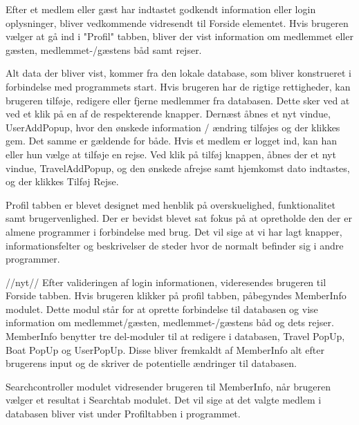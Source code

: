 Efter et medlem eller gæst har indtastet godkendt information eller login oplysninger, bliver vedkommende vidresendt til Forside elementet. Hvis brugeren vælger at gå ind i "Profil" tabben, bliver der vist information om medlemmet eller gæsten, medlemmet-/gæstens båd samt rejser. 

Alt data der bliver vist, kommer fra den lokale database, som bliver konstrueret i forbindelse med programmets start.
Hvis brugeren har de rigtige rettigheder, kan brugeren tilføje, redigere eller fjerne medlemmer fra databasen. Dette sker ved at ved et klik på en af de respekterende knapper. Dernæst åbnes et nyt vindue, UserAddPopup, hvor den ønskede information / ændring tilføjes og der klikkes gem. Det samme er gældende for både.
Hvis et medlem er logget ind, kan han eller hun vælge at tilføje en rejse. Ved klik på tilføj knappen, åbnes der et nyt vindue, TravelAddPopup, og den ønskede afrejse samt hjemkomst dato indtastes, og der klikkes Tilføj Rejse. 

Profil tabben er blevet designet med henblik på overskuelighed, funktionalitet samt brugervenlighed. Der er bevidst blevet sat fokus på at opretholde den der er almene programmer i forbindelse med brug. Det vil sige at vi har lagt knapper, informationsfelter og beskrivelser de steder hvor de normalt befinder sig i andre programmer.

//nyt//
Efter valideringen af login informationen, videresendes brugeren til Forside tabben. Hvis brugeren klikker på profil tabben, påbegyndes MemberInfo modulet. Dette modul står for at oprette forbindelse til databasen og vise information om medlemmet/gæsten, medlemmet-/gæstens båd og dets rejser. MemberInfo benytter tre del-moduler til at redigere i databasen, Travel PopUp, Boat PopUp og UserPopUp. Disse bliver fremkaldt af MemberInfo alt efter brugerens input og de skriver de potentielle ændringer til databasen.

Searchcontroller modulet vidresender brugeren til MemberInfo, når brugeren vælger et resultat i Searchtab modulet. Det vil sige at det valgte medlem i databasen bliver vist under Profiltabben i programmet.  

